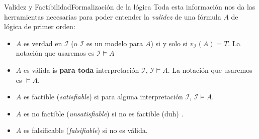 \documentclass[spanish, c]{beamer}
\begin{document}
\begin{frame}{Validez y Factibilidad}{Formalización de la lógica}
    Toda esta información nos da las herramientas necesarias para poder entender la \textit{validez} de una fórmula $A$ de lógica de primer orden:

    \bigskip

    \begin{itemize}
        \item $A$ es \alert{verdad} en $\mathscr{I}$ (o $\mathscr{I}$ es un \alert{modelo} para $A$) si y solo si $v_{\mathscr{I}}(A) = T$. La notación que usaremos es $\mathscr{I} \models A$
        \item $A$ es \alert{válida} is \textbf{para toda} interpretación $\mathscr{I}$, $\mathscr{I} \models A$. La notación que usaremos es $\models A$.
        \item $A$ es \alert{factible} (\textit{satisfiable}) si para alguna interpretación $\mathscr{I}$, $\mathscr{I} \models A$.
        \item $A$ es \alert{no factible} (\textit{unsatisfiable}) si no es factible (duh) .
        \item $A$ es \alert{falsificable} (\textit{falsifiable}) si no es válida.
    \end{itemize}
\end{frame}







\end{document}
